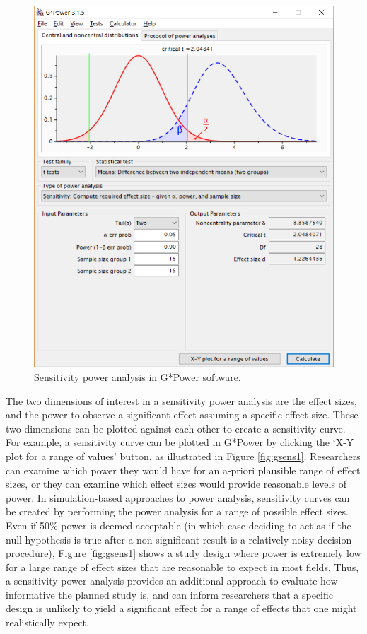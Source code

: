 \documentclass[
]{krantz}
\begin{document}
\begin{figure}

{\centering \includegraphics[width=1\linewidth]{images/gpow_sensitivity_1} 

}

\caption{Sensitivity power analysis in G*Power software.}\label{fig:gsens0}
\end{figure}

The two dimensions of interest in a sensitivity power analysis are the effect sizes, and the power to observe a significant effect assuming a specific effect size. These two dimensions can be plotted against each other to create a sensitivity curve. For example, a sensitivity curve can be plotted in G*Power by clicking the `X-Y plot for a range of values' button, as illustrated in Figure \ref{fig:gsens1}. Researchers can examine which power they would have for an a-priori plausible range of effect sizes, or they can examine which effect sizes would provide reasonable levels of power. In simulation-based approaches to power analysis, sensitivity curves can be created by performing the power analysis for a range of possible effect sizes. Even if 50\% power is deemed acceptable (in which case deciding to act as if the null hypothesis is true after a non-significant result is a relatively noisy decision procedure), Figure \ref{fig:gsens1} shows a study design where power is extremely low for a large range of effect sizes that are reasonable to expect in most fields. Thus, a sensitivity power analysis provides an additional approach to evaluate how informative the planned study is, and can inform researchers that a specific design is unlikely to yield a significant effect for a range of effects that one might realistically expect.
\end{document}
